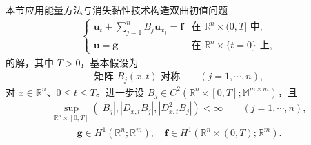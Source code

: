 \documentclass[../../main.tex]{subfiles}
\begin{document}
本节应用能量方法与消失黏性技术构造双曲初值问题
\begin{align}
\begin{cases}
\mathbf{u}_t+\sum_{j=1}^n B_j\mathbf{u}_{x_j}=\mathbf{f}&\text{在 }\mathbb{R}^n\times(0,T]\text{ 中},\\
\mathbf{u}=\mathbf{g}&\text{在 }\mathbb{R}^n\times\{t=0\}\text{ 上},
\end{cases}\label{align:ch07-3-eq05}
\end{align}
的解，其中 $T>0$，基本假设为
\begin{align}
\text{矩阵 }B_j(x,t)\text{ 对称}\qquad (j=1,\cdots,n),\label{align:ch07-3-eq06}
\end{align}
对 $x\in\mathbb{R}^n$、$0\leqslant t\leqslant T$。进一步设 $B_j\in C^2(\mathbb{R}^n\times[0,T];\mathbb{M}^{m\times m})$，且
\begin{align}
\sup_{\mathbb{R}^n\times[0,T]}(|B_j|,|D_{x,t}B_j|,|D^2_{x,t}B_j|)<\infty\qquad (j=1,\cdots,n),\label{align:ch07-3-eq07}
\end{align}
\begin{align}
\mathbf{g}\in H^1(\mathbb{R}^n;\mathbb{R}^m),\quad \mathbf{f}\in H^1(\mathbb{R}^n\times(0,T);\mathbb{R}^m).\label{align:ch07-3-eq08}
\end{align}
\end{document}
